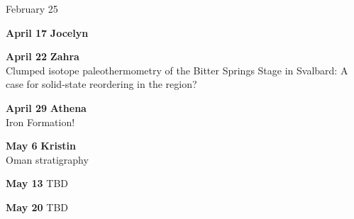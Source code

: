 \documentclass{article}
\begin{document}
\begin{labeling}{February 25 \hspace{1.5cm}}
\item [\textbf{April 17}] \textbf{Jocelyn}\\
\item [\textbf{April 22}] \textbf{Zahra}\\Clumped isotope paleothermometry of the Bitter Springs Stage in Svalbard: A case for solid-state reordering in the region?
\item [\textbf{April 29}] \textbf{Athena}\\Iron Formation!
\item [\textbf{May 6}] \textbf{Kristin} \\ Oman stratigraphy
\item [\color{red}\textbf{May 13}] {\color{red}TBD}
\item [\color{red}\textbf{May 20}] {\color{red}TBD}
\end{labeling}
\end{document}
